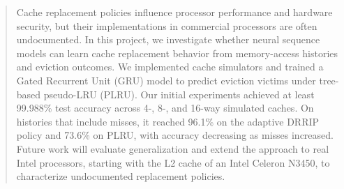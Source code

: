 \begin{abstract}
Cache replacement policies influence processor performance
and hardware security, but their implementations in commercial
processors are often undocumented. In this project, we
investigate whether neural sequence models can learn cache
replacement behavior from memory-access histories and eviction
outcomes. We implemented cache simulators and trained a Gated
Recurrent Unit (GRU) model to predict eviction victims under
tree-based pseudo-LRU (PLRU). Our initial experiments achieved
at least 99.988\% test accuracy across 4-, 8-, and 16-way
simulated caches. On histories that include misses, it
reached 96.1\% on the adaptive DRRIP policy and 73.6\% on
PLRU, with accuracy decreasing as misses increased.
Future work will evaluate generalization and extend the
approach to real Intel processors, starting with the L2
cache of an Intel Celeron N3450, to characterize undocumented
replacement policies.
\end{abstract}

